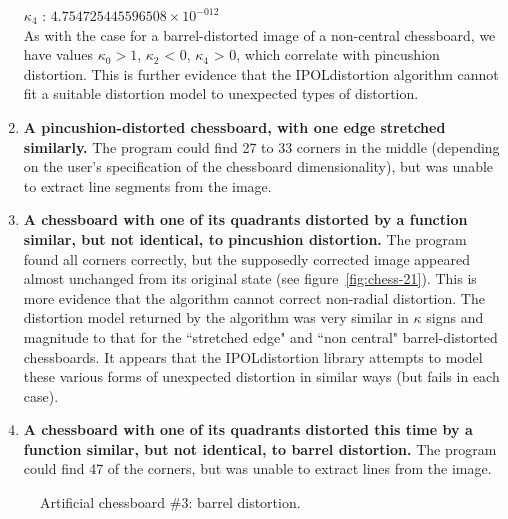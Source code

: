 \begin{enumerate}
   $ \kappa_{4}$ : $4.754725445596508 \times 10^{-012}$\\
  As with the case for a barrel-distorted image of a non-central chessboard, we have values $\kappa_{0} > 1$, $\kappa_{2}$ < 0, $\kappa_{4}$ > 0, which correlate with pincushion distortion. This is further evidence that the IPOLdistortion algorithm cannot fit a suitable distortion model to unexpected types of distortion.
  \item \textbf{A pincushion-distorted chessboard, with one edge stretched similarly.} The program could find 27 to 33 corners in the middle (depending on the user's specification of the chessboard dimensionality), but was unable to extract line segments from the image.
  \item \textbf{A chessboard with one of its quadrants distorted by a function similar, but not identical, to pincushion distortion.} The program found all corners correctly, but the supposedly corrected image appeared almost unchanged from its original state (see figure~\ref{fig:chess-21}). This is more evidence that the algorithm cannot correct non-radial distortion. The distortion model returned by the algorithm was very similar in $\kappa$ signs and magnitude to that for the ``stretched edge" and ``non central" barrel-distorted chessboards. It appears that the IPOLdistortion library attempts to model these various forms of unexpected distortion in similar ways (but fails in each case).
  \item \textbf{A chessboard with one of its quadrants distorted this time by a function similar, but not identical, to barrel distortion.} The program could find 47 of the corners, but was unable to extract lines from the image.
\end{enumerate}

\begin{figure}
  \centering
  \caption{Artificial chessboard \#3: barrel distortion.}
  \label{fig:chess-3}
\end{figure}

